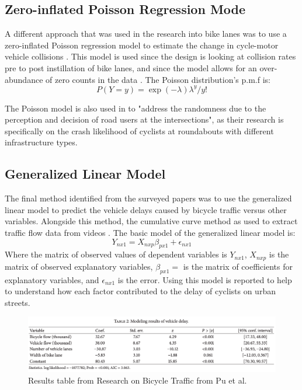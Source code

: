 \documentclass[12pt, letterpaper]{article}
\begin{document}
\subsection{Zero-inflated Poisson Regression Mode}
\label{sec:pois}

A different approach that was used in the research into bike lanes was to use a zero-inflated Poisson regression model to estimate the change in cycle-motor vehicle collisions \cite{8Bhatia2016}. This model is used since the design is looking at collision rates pre to post instillation of bike lanes, and since the model allows for an over-abundance of zero counts in the data \cite{Giles2010}. The Poisson distribution's p.m.f is:
\[P(Y=y) = \exp{(-\lambda)\lambda^{y}}/y!\]

The Poisson model is also used in \citet{9Cantisani2021} to "address the randomness due to the perception and decision of road users at the intersections", as their research is specifically on the crash likelihood of cyclists at roundabouts with different infrastructure types. 

\subsection{Generalized Linear Model}
\label{sec:gen}

The final method identified from the surveyed papers was to use the generalized linear model to predict the vehicle delays caused by bicycle traffic versus other variables. Alongside this method, the cumulative curve method as used to extract traffic flow data from videos \cite{6Pu2017}. The basic model of the generalized linear model is:
\[Y_{nx1} = X_{nxp}\beta_{px1}+\epsilon_{nx1}\]
Where the matrix of observed values of dependent variables is  $Y_{nx1}$, $X_{nxp}$ is the matrix of observed explanatory variables, $\beta_{px1} =$ is the matrix of coefficients for explanatory variables, and $\epsilon_{nx1}$ is the error. Using this model is reported to help to understand how each factor contributed to the delay of cyclists on urban streets.   
\begin{figure}[tbp]
    \centering \includegraphics[width=1\textwidth]{BikeTrafficResults.png}
    \caption{Results table from Research on Bicycle Traffic from Pu et al.}
    \label{fig:traffic}
\end{figure}
\end{document}
